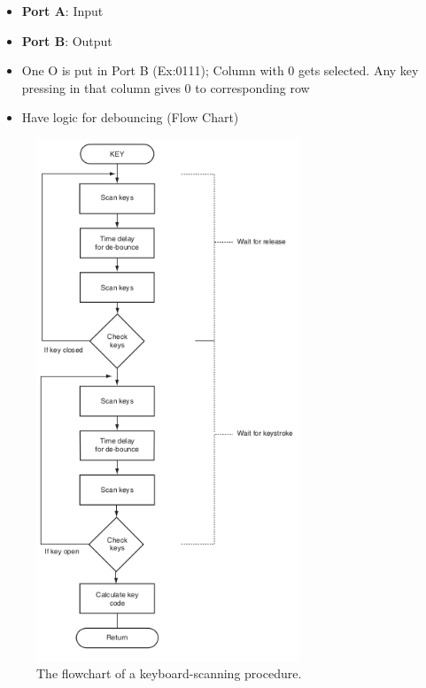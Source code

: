 \begin{itemize}
  \item \textbf{Port A}: Input
  \item \textbf{Port B}: Output
  \item One O is put in Port B (Ex:0111); Column with 0 gets selected. Any key pressing in that column gives 0 to corresponding row
  \item Have logic for debouncing (Flow Chart)

\end{itemize}

\begin{figure}[h!]
  \includegraphics[width = 0.7\textwidth]{./figures/Debounce.png}
  \caption{The flowchart of a keyboard-scanning procedure.}
\end{figure}
\newpage
